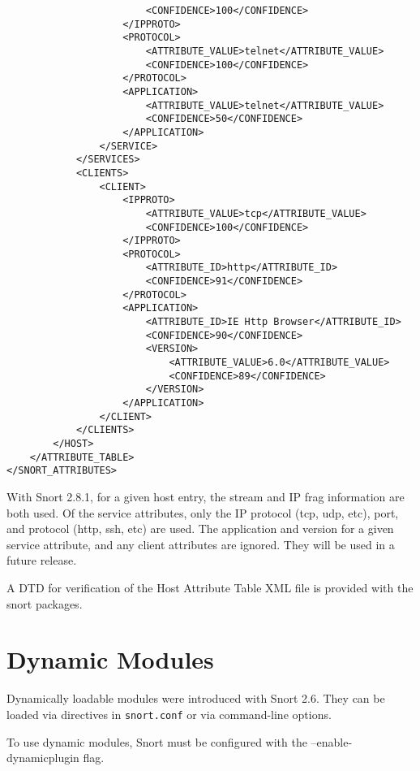 \documentclass[english]{report}
\newenvironment{note}{
\samepage
    \vspace{10pt}{\textsf{
        {\hspace{7pt}\Huge{$\triangle$\hspace{-12.5pt}{\Large{$^!$}}}}\hspace{5pt}
        {\Large{NOTE}}
    }
    }
   \begin{center}
    \par\vspace{-17pt}

    \begin{lrbox}{\savepar}
    \begin{minipage}[r]{6in}
}
{
    \end{minipage}
    \end{lrbox}
    \fbox{
        \usebox{
            \savepar
	}
    }
    \par\vskip10pt
    \end{center}
}
\newenvironment{note}{
        \begin{rawhtml}
        <p><table border="1"><tr><td><b>
        Note:&nbsp;&nbsp;</b>
        \end{rawhtml}
}{
        \begin{rawhtml}
        </b></td></tr></table></p>
        \end{rawhtml}
}
\begin{document}
\begin{verbatim}
                        <CONFIDENCE>100</CONFIDENCE>
                    </IPPROTO>
                    <PROTOCOL>
                        <ATTRIBUTE_VALUE>telnet</ATTRIBUTE_VALUE>
                        <CONFIDENCE>100</CONFIDENCE>
                    </PROTOCOL>
                    <APPLICATION>
                        <ATTRIBUTE_VALUE>telnet</ATTRIBUTE_VALUE>
                        <CONFIDENCE>50</CONFIDENCE>
                    </APPLICATION>
                </SERVICE>
            </SERVICES>
            <CLIENTS>
                <CLIENT>
                    <IPPROTO>
                        <ATTRIBUTE_VALUE>tcp</ATTRIBUTE_VALUE>
                        <CONFIDENCE>100</CONFIDENCE>
                    </IPPROTO>
                    <PROTOCOL>
                        <ATTRIBUTE_ID>http</ATTRIBUTE_ID>
                        <CONFIDENCE>91</CONFIDENCE>
                    </PROTOCOL>
                    <APPLICATION>
                        <ATTRIBUTE_ID>IE Http Browser</ATTRIBUTE_ID>
                        <CONFIDENCE>90</CONFIDENCE>
                        <VERSION>
                            <ATTRIBUTE_VALUE>6.0</ATTRIBUTE_VALUE>
                            <CONFIDENCE>89</CONFIDENCE>
                        </VERSION>
                    </APPLICATION>
                </CLIENT>
            </CLIENTS>
        </HOST>
    </ATTRIBUTE_TABLE>
</SNORT_ATTRIBUTES>
\end{verbatim}

\begin{note}
With Snort 2.8.1, for a given host entry, the stream and IP frag information
are both used.  Of the service attributes, only the IP protocol (tcp, udp,
etc), port, and protocol (http, ssh, etc) are used.  The application and
version for a given service attribute, and any client attributes are
ignored.  They will be used in a future release.
\end{note}

A DTD for verification of the Host Attribute Table XML file is provided
with the snort packages.

\section{Dynamic Modules}

Dynamically loadable modules were introduced with Snort 2.6.  They can
be loaded via directives in \texttt{snort.conf} or via command-line options.

\begin{note}
To use dynamic modules, Snort must be configured with the
--enable-dynamicplugin flag.
\end{note}
\end{document}
